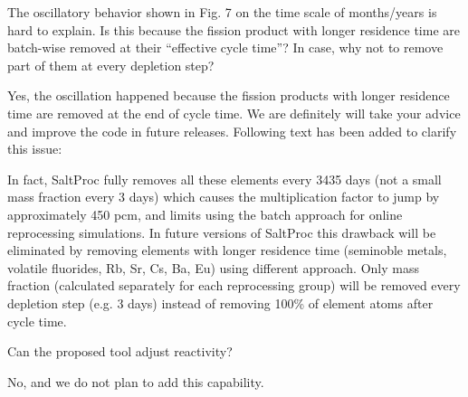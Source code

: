 \documentclass[answers,11pt]{exam}
\begin{document}
\begin{questions}

        \question The oscillatory behavior shown in Fig. 7 on the time scale of 
        months/years is hard to explain. Is this because the fission product 
        with longer residence time are batch-wise removed at their ``effective 
        cycle time''? In case, why not to remove part of them at every depletion 
        step?  
        \begin{solution}
                Yes, the oscillation happened because the fission products 
        		with longer residence time are removed at the end of cycle time. We are 
                definitely will take your advice and improve the code in future 
                releases. Following text has been added to clarify this issue:
                
                In fact, SaltProc fully removes all these elements every 3435 days 
                (not a small mass fraction every 3 days) which causes the 
                multiplication factor to jump by approximately 450 pcm, and limits 
                using the batch approach for online reprocessing simulations. In 
                future versions of SaltProc this drawback will be eliminated by 
                removing elements with longer residence time (seminoble metals, 
                volatile fluorides, Rb, Sr, Cs, Ba, Eu) using different approach. 
                Only mass fraction (calculated separately for each reprocessing 
                group) will be removed every depletion step (e.g. 3 days) instead 
                of removing 100\% of element atoms after cycle time.
        \end{solution}


        \question Can the proposed tool adjust reactivity?
        \begin{solution}
                No, and we do not plan to add this capability.
        \end{solution}



\end{questions}
\end{document}
